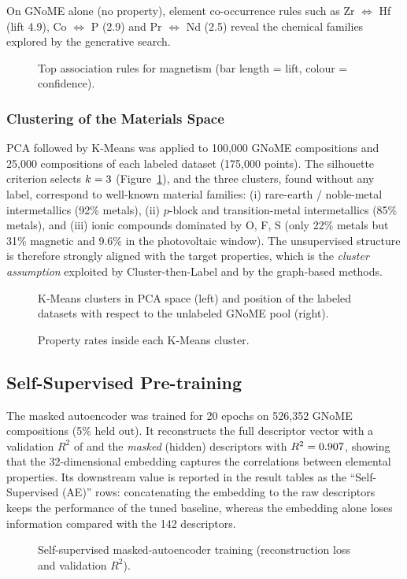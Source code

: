 On GNoME alone (no property), element co-occurrence rules such as Zr $\Leftrightarrow$ Hf (lift
4.9), Co $\Leftrightarrow$ P (2.9) and Pr $\Leftrightarrow$ Nd (2.5) reveal the chemical
families explored by the generative search.

\begin{figure}[H]
  \centering
  \caption{Top association rules for magnetism (bar length = lift, colour = confidence).}
\end{figure}

\subsubsection{Clustering of the Materials Space}
PCA followed by K-Means was applied to 100,000 GNoME compositions and 25,000 compositions of
each labeled dataset (175,000 points). The silhouette criterion selects $k=3{}$
(Figure~\ref{fig:km}), and the three clusters, found without any label, correspond to
well-known material families: (i) rare-earth / noble-metal intermetallics (92\% metals),
(ii) $p$-block and transition-metal intermetallics (85\% metals), and (iii) ionic compounds
dominated by O, F, S (only 22\% metals but 31\% magnetic and 9.6\% in the photovoltaic window).
The unsupervised structure is therefore strongly aligned with the target properties, which is
the \emph{cluster assumption} exploited by Cluster-then-Label and by the graph-based methods.

\begin{figure}[H]
  \centering
  \caption{K-Means clusters in PCA space (left) and position of the labeled datasets with
  respect to the unlabeled GNoME pool (right).}\label{fig:km}
\end{figure}

\begin{figure}[H]
  \centering
  \caption{Property rates inside each K-Means cluster.}
\end{figure}

\subsection{Self-Supervised Pre-training}
The masked autoencoder was trained for 20 epochs on 526,352 GNoME compositions (5\% held out).
It reconstructs the full descriptor vector with a validation $R^2$ of \AERtwo{} and the
\emph{masked} (hidden) descriptors with $R^2 = 0.907{}$, showing that the 32-dimensional
embedding captures the correlations between elemental properties. Its downstream value is
reported in the result tables as the ``Self-Supervised (AE)'' rows: concatenating the embedding
to the raw descriptors keeps the performance of the tuned baseline, whereas the embedding alone
loses information compared with the 142 descriptors.

\begin{figure}[H]
  \centering
  \caption{Self-supervised masked-autoencoder training (reconstruction loss and validation
  $R^2$).}
\end{figure}
